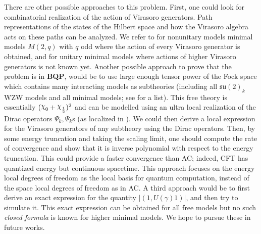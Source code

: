 \documentclass[twoside,11pt,titlepage]{amsart}
\renewcommand{\=}[1]{\stackrel{#1}{=}} %
\theoremstyle{definition}
\theoremstyle{remark}
\DeclareRobustCommand{\rchi}{{\mathpalette\irchi\relax}}
\newcommand{\irchi}[2]{\raisebox{\depth}{$#1\chi$}}
\begin{document}
There are other possible approaches to this problem. First, one could look for combinatorial realization of the action of Virasoro generators. Path representations of the states of the Hilbert space and how the Virasoro algebra acts on these paths can be analyzed. We refer to \cite{kaufmann1995path} for nonunitary models minimal models $M(2,q)$ with $q$ odd where the action of every Virasoro generator is obtained, and \cite{feverati2003critical} for unitary minimal models where actions of higher Virasoro generators is not known yet. Another possible approach to prove that the problem is in \textbf{BQP}, would be to use large enough tensor power of the Fock space which contains many interacting models as subtheories (including all $\mathfrak{su}(2)_k$ WZW models and all minimal models; see \cite[section 4]{tener2016geometric} for a list). This free theory is essentially $(\rchi_0+\rchi_\frac{1}{2})^2$ and can be modelled using an ultra local realization of the Dirac operators $\Psi_k,\overline{\Psi}_k$s (as localized in \cite{bravyi2002fermionic}). We could then derive a local expression for the Virasoro generators of any subtheory using the Dirac operators. Then, by some energy truncation and taking the scaling limit, one should compute the rate of convergence and show that it is inverse polynomial with respect to the energy truncation. This could provide a faster convergence than AC; indeed, CFT has quantized energy but continuous spacetime. This approach focuses on the energy local degrees of freedom as the local basis for quantum computation, instead of the space local degrees of freedom as in AC. A third approach would be to first derive an exact expression for the quantity $|(1,U(\gamma)1)|$, and then try to simulate it. This exact expression can be obtained for all free models \cite[see Theorem 6.2.3 and section 7]{neretin1996categories} but no such \textit{closed formula} is known for higher minimal models. We hope to pursue these in future works.
\end{document}
